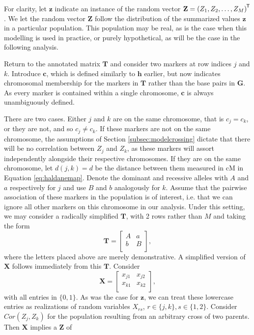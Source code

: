 \documentclass{article}
\newcommand{\ve}[1]{\mathbf{#1}}           %
\newcommand{\m}[1]{\mathbf{#1}}               %
\newcommand{\tr}[1]{{#1}^{\mkern-1.5mu\mathsf{T}}}              %
\begin{document}
For clarity, let $\ve{z}$ indicate an instance of the random vector $\ve{Z} = \tr{(Z_1, Z_2, \dots, Z_M)}$. We let the random vector $\ve{Z}$ follow the distribution of the summarized values $\ve{z}$ in a particular population. This population may be real, as is the case when this modelling is used in practice, or purely hypothetical, as will be the case in the following analysis.

Return to the annotated matrix $\m{T}$ and consider two markers at row indices $j$ and $k$. Introduce $\ve{c}$, which is defined similarly to $\ve{h}$ earlier, but now indicates chromosomal membership for the markers in $\m{T}$ rather than the base pairs in $\m{G}$. As every marker is contained within a single chromosome, $\ve{c}$ is always unambiguously defined.

There are two cases. Either $j$ and $k$ are on the same chromosome, that is $c_j = c_k$, or they are not, and so $c_j \neq c_k$. If these markers are not on the same chromosome, the assumptions of Section \ref{subsec:modelcrossing} dictate that there will be no correlation between $Z_j$ and $Z_k$, as these markers will assort independently alongside their respective chromosomes. If they are on the same chromosome, let $d(j,k) = d$ be the distance between them measured in cM in Equation \ref{eq:haldanemap}. Denote the dominant and recessive alleles with $A$ and $a$ respectively for $j$ and use $B$ and $b$ analogously for $k$. Assume that the pairwise association of these markers in the population is of interest, i.e. that we can ignore all other markers on this chromosome in our analysis. Under this setting, we may consider a radically simplified $\m{T}$, with 2 rows rather than $M$ and taking the form
$$\m{T} = \begin{bmatrix}
  A & a \\
  b & B \\
\end{bmatrix},$$
where the letters placed above are merely demonstrative. A simplified version of $\m{X}$ follows immediately from this $\m{T}$. Consider
$$\m{X} = \begin{bmatrix}
  x_{j1} & x_{j2} \\
  x_{k1} & x_{k2} \\
\end{bmatrix},$$
with all entries in $\{0,1\}$. As was the case for $\ve{z}$, we can treat these lowercase entries as realizations of random variables $X_{rs}$, $r \in \{j,k\}, s \in \{1,2\}$. Consider $Cor(Z_j, Z_k)$ for the population resulting from an arbitrary cross of two parents. Then $\m{X}$ implies a $\ve{Z}$ of
\end{document}
